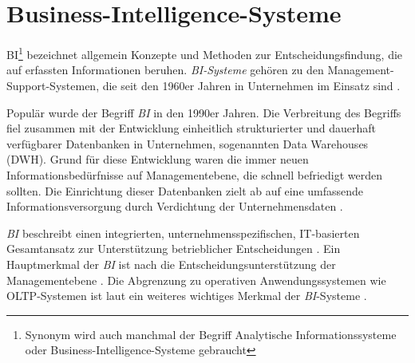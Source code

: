 

\section{Business-Intelligence-Systeme}
\acrfull{BI}\footnote{Synonym wird auch manchmal der Begriff Analytische Informationssysteme oder Business-Intelligence-Systeme gebraucht}
bezeichnet allgemein Konzepte und Methoden zur Entscheidungsfindung, die auf
erfassten Informationen beruhen. 
\textit{\acrshort{BI}-Systeme} gehören zu den Management-Support-Systemen, die seit den 1960er Jahren in Unternehmen im Einsatz sind \cite[vgl.][83]{gronwald_integrierte_2020}.

Populär wurde der Begriff \textit{\acrshort{BI}} in den 1990er Jahren. Die Verbreitung des Begriffs fiel zusammen mit der 
Entwicklung einheitlich strukturierter und dauerhaft verfügbarer Datenbanken in Unternehmen, sogenannten Data Warehouses (DWH). 
Grund für diese Entwicklung waren die immer neuen Informationsbedürfnisse auf Managementebene, die schnell befriedigt werden sollten.
Die Einrichtung dieser Datenbanken zielt ab auf eine umfassende Informationsversorgung durch Verdichtung der Unternehmensdaten 
\cite[vgl.][268 ff.]{abts_grundkurs_2017}. 

\textit{\acrshort{BI}} beschreibt einen integrierten, unternehmensspezifischen,
IT-basierten Gesamtansatz zur Unterstützung betrieblicher Entscheidungen \cite[vgl.][270]{abts_grundkurs_2017}. 
Ein Hauptmerkmal der \textit{\acrshort{BI}} ist nach  die Entscheidungsunterstützung der Managementebene
\cite[vgl.][111]{linden_geschaftsmodellbasierte_2016}. Die Abgrenzung zu operativen
Anwendungssystemen wie \acrfull{OLTP}-Systemen ist laut \citeauthor{abts_grundkurs_2017} ein weiteres wichtiges Merkmal der \textit{\acrshort{BI}}-Systeme \cite[vgl.][267]{abts_grundkurs_2017}. 


